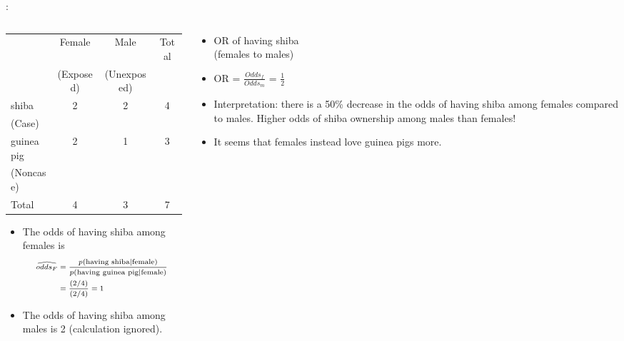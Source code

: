 \begin{frame}{\secname: \subsecname}
\begin{columns}[t]

\begin{column}{0.5\textwidth}
\vspace{-10mm}
\begin{table}[h]
	\scriptsize
\begin{center}
\begin{tabular}{lccc}
\toprule
   & Female    & Male            & Total  \\ 
   & (Exposed) & (Unexposed)     &        \\ \midrule
shiba  & 2        & 2            & 4         \\
(Case) &          &              &           \\
guinea pig   & 2        & 1            & 3   \\
(Noncase) &          &              &           \\

Total  & 4        & 3            & 7     \\ \bottomrule
\end{tabular}
\end{center}
\end{table}

\begin{itemize}
	\normalsize
\item<2|handout:2-> The odds of having shiba among females is 
	\begin{displaymath}
		\scriptsize
	\begin{split}
			\widehat{odds_F} &=\frac{p(\text{having shiba}|\text{female})}{p(\text{having guinea pig}|\text{female})}\\
	                	&= \frac{(2/4) }{(2/4)} = 1
	\end{split}
		\end{displaymath}
\item<2|handout:2-> The odds of having shiba among males is 2 (calculation ignored).	
\end{itemize}
    \end{column}
    
	\begin{column}{0.5\textwidth}
	\normalsize
	\begin{itemize}
	\item<3|handout:3-> OR of having shiba \\ (females to males) 
	\item<3|handout:3-> OR = $\frac{Odds_{f}}{Odds_{m}}$ = $\frac{1}{2}$
	\item<4|handout:4> Interpretation: there is a 50\% decrease in the odds of having shiba among females compared to males. Higher odds of shiba ownership among males than females! 
	\item<4|handout:4> It seems that females instead love guinea pigs more.

	\end{itemize}

    	
    \end{column}
 \end{columns}
\end{frame}
